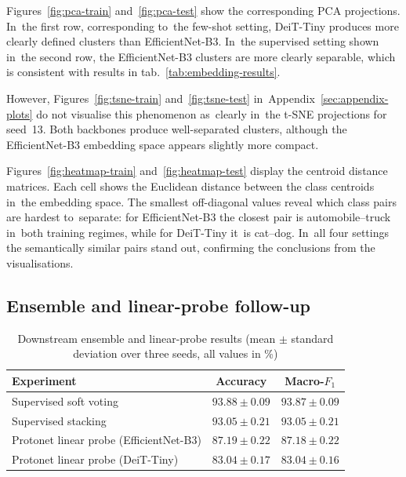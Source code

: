 \documentclass[12pt,a4paper]{article}
\begin{document}
Figures~\ref{fig:pca-train} and~\ref{fig:pca-test} show the corresponding PCA projections. In~the first row, corresponding to~the few-shot setting, DeiT-Tiny produces more clearly defined clusters than EfficientNet-B3. In~the supervised setting shown in~the second row, the EfficientNet-B3 clusters are more clearly separable, which is consistent with results in tab.~\ref{tab:embedding-results}.

However, Figures~\ref{fig:tsne-train} and~\ref{fig:tsne-test} in~Appendix~\ref{sec:appendix-plots} do not visualise this phenomenon as~clearly in~the t-SNE projections for seed~13. Both backbones produce well-separated clusters, although the EfficientNet-B3 embedding space appears slightly more compact.

Figures~\ref{fig:heatmap-train} and~\ref{fig:heatmap-test} display the centroid distance matrices. Each cell shows the Euclidean distance between the class centroids in~the embedding space. The smallest off-diagonal values reveal which class pairs are hardest to~separate: for EfficientNet-B3 the closest pair is automobile--truck in~both training regimes, while for DeiT-Tiny it~is cat--dog. In~all four settings the semantically similar pairs stand out, confirming the conclusions from the visualisations.

\subsection{Ensemble and linear-probe follow-up}
\label{subsec:ensemble-results}

\begin{table}[t!]
\centering
\caption{Downstream ensemble and linear-probe results (mean $\pm$ standard deviation over three seeds, all values in \%)}
\label{tab:ensemble-results}
\smallskip
\small
\begin{tabular}{@{}lcc@{}}
\toprule
\textbf{Experiment} & \textbf{Accuracy} & \textbf{Macro-$F_1$} \\
\midrule
Supervised soft voting & $93.88 \pm 0.09$ & $93.87 \pm 0.09$ \\
Supervised stacking & $93.05 \pm 0.21$ & $93.05 \pm 0.21$ \\
Protonet linear probe (EfficientNet-B3) & $87.19 \pm 0.22$ & $87.18 \pm 0.22$ \\
Protonet linear probe (DeiT-Tiny) & $83.04 \pm 0.17$ & $83.04 \pm 0.16$ \\
\bottomrule
\end{tabular}
\end{table}
\end{document}
